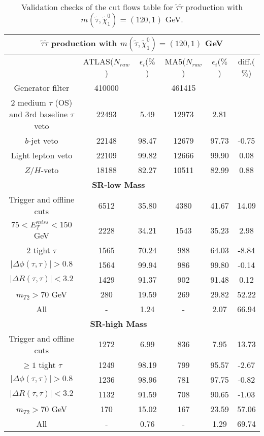 \documentclass[12pt,A4paper,pdftex, ]{article}
\begin{document}
\begin{table}[h!]
\begin{center}
\begin{tabular}{|c|c|c|c|c|c|}
\hline
\multicolumn{6}{|c|}{ \textbf{$ \tilde{\tau}\tilde{\tau} $ production with $ m(\tilde{\tau},\tilde{\chi}^0_1) = (120,1) $ GeV} }\\
\hline\hline
 & ATLAS($N_{raw}$) & $\epsilon_i$($\%$) & MA5($N_{raw}$) & $\epsilon_i$($\%$) & diff.($\%$) \\
\hline\hline
Generator filter & 410000 & & 461415 & & \\ \hline
2 medium $\tau$ (OS) and 3rd baseline $\tau$ veto & 22493 & 5.49 & 12973 & 2.81 & \\ \hline
$b$-jet veto & 22148 & 98.47 & 12679 & 97.73 & -0.75 \\ \hline
Light lepton veto & 22109 & 99.82 & 12666 & 99.90 & 0.08 \\ \hline
$Z/H$-veto & 18188 & 82.27 & 10511 & 82.99 & 0.88 \\ \hline
\multicolumn{5}{|c|}{ \textbf{SR-low Mass} }\\\hline
Trigger and offline cuts & 6512 & 35.80 & 4380 & 41.67 & 14.09 \\ \hline
$ 75 < E^{miss}_T < 150 $ GeV & 2228 & 34.21 & 1543 & 35.23 & 2.98 \\ \hline
2 tight $\tau$ & 1565 & 70.24 & 988 & 64.03 & -8.84 \\ \hline
$ |\Delta\phi(\tau,\tau)| > 0.8 $ & 1564 & 99.94 & 986 & 99.80 & -0.14 \\ \hline
$ |\Delta R(\tau,\tau)| < 3.2 $ & 1429 & 91.37 & 902 & 91.48 & 0.12 \\ \hline
$ m_{T2} > 70 $ GeV & 280 & 19.59 & 269 & 29.82 & 52.22 \\ \hline
All & - & 1.24 & - & 2.07 & 66.94 \\ \hline
\hline
\multicolumn{5}{|c|}{ \textbf{SR-high Mass} }\\\hline
Trigger and offline cuts & 1272 & 6.99 & 836 & 7.95 & 13.73 \\ \hline
$ \geq 1 $ tight $\tau$ & 1249 & 98.19 & 799 & 95.57 & -2.67 \\ \hline
$ |\Delta\phi(\tau,\tau)| > 0.8 $ & 1236 & 98.96 & 781 & 97.75 & -0.82 \\ \hline
$ |\Delta R(\tau,\tau)| < 3.2 $ & 1132 & 91.59 & 708 & 90.65 & -1.03 \\ \hline
$ m_{T2} > 70 $ GeV & 170 & 15.02 & 167 & 23.59 & 57.06 \\ \hline
All & - & 0.76 & - & 1.29 & 69.74 \\ \hline
\end{tabular}
\end{center}
\caption{Validation checks of the cut flows table for $ \tilde{\tau}\tilde{\tau} $ production with $ m(\tilde{\tau},\tilde{\chi}^0_1) = (120,1) $ GeV.}
\label{120GeV}
\end{table} 
\end{document}
